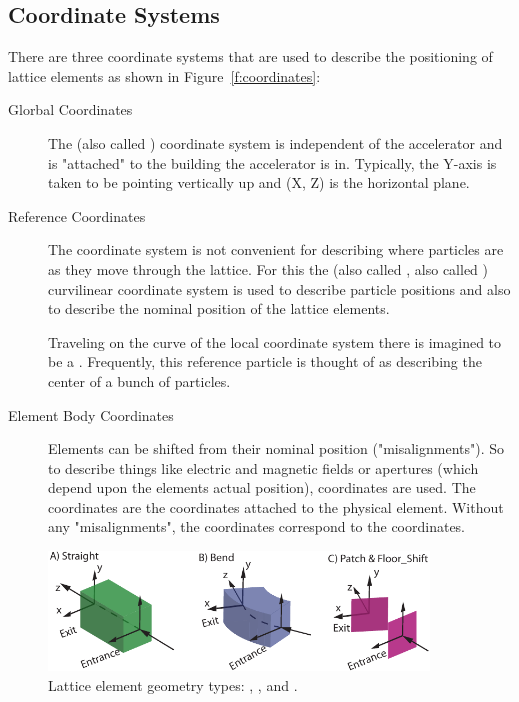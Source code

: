 \documentclass{hitec}
\begin{document}
\subsection{Coordinate Systems}

There are three coordinate systems that are used to describe the positioning
of lattice elements as shown in Figure~\ref{f:coordinates}:
\begin{description}
\item[Glorbal Coordinates] \Newline
The  (also called ) coordinate system is independent of the accelerator and is 
"attached" to the building the accelerator is in. Typically, the Y-axis is taken to be pointing vertically up
and (X, Z) is the horizontal plane.
\item[Reference Coordinates] \Newline
The  coordinate system is not convenient for describing where particles are as they move
through the lattice. For this the  (also called , also called ) curvilinear coordinate 
system is used to describe particle positions and also to describe the nominal position of the
lattice elements.

Traveling on the  curve of the local coordinate system there is imagined to be a .
Frequently, this reference particle is thought of as describing the center of a bunch of particles.
\item[Element Body Coordinates] \Newline
Elements can be shifted from their nominal position ("misalignments"). So to describe things like
electric and magnetic fields or apertures (which depend upon the elements actual position),
 coordinates are used. 
The  coordinates are the coordinates attached to the physical element. Without any "misalignments",
the  coordinates correspond to the  coordinates.
\end{description}

\begin{figure}[tb]
  \centering
  \includegraphics[width=0.9\textwidth]{element-coord-frame.pdf}
  \caption{Lattice element geometry types: , , and .}
  \label{f:body.types}
\end{figure}
\end{document}
